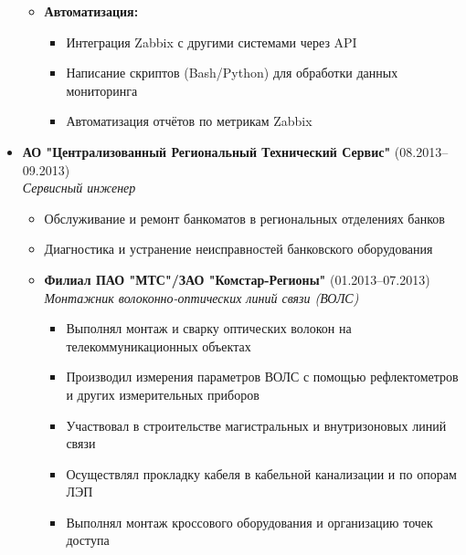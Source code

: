 \documentclass[11pt]{article}
\begin{document}
\begin{itemize}
\begin{itemize}
        \item \textbf{Автоматизация:}
        \begin{itemize}
            \item Интеграция Zabbix с другими системами через API
            \item Написание скриптов (Bash/Python) для обработки данных мониторинга
            \item Автоматизация отчётов по метрикам Zabbix
        \end{itemize}
    \end{itemize}
    \item \textbf{АО "Централизованный Региональный Технический Сервис"} (08.2013–09.2013) \\
    \textit{Сервисный инженер}
    \begin{itemize}
        \item Обслуживание и ремонт банкоматов в региональных отделениях банков
        \item Диагностика и устранение неисправностей банковского оборудования
    \end{itemize}
    \begin{itemize}
        \item \textbf{Филиал ПАО "МТС"/ЗАО "Комстар-Регионы"} (01.2013–07.2013) \\
        \textit{Монтажник волоконно-оптических линий связи (ВОЛС)}
        \begin{itemize}
            \item Выполнял монтаж и сварку оптических волокон на телекоммуникационных объектах
            \item Производил измерения параметров ВОЛС с помощью рефлектометров и других измерительных приборов
            \item Участвовал в строительстве магистральных и внутризоновых линий связи
            \item Осуществлял прокладку кабеля в кабельной канализации и по опорам ЛЭП
            \item Выполнял монтаж кроссового оборудования и организацию точек доступа
        \end{itemize}
\end{itemize}
\end{itemize}
\end{document}
